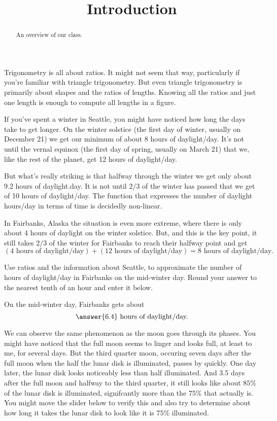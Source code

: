 \documentclass{ximera}
\title{Introduction}
\begin{document}
\begin{abstract}
An overview of our class.
\end{abstract}
\maketitle

Trigonometry is all about ratios. It might not seem that way, particularly if you're familiar with triangle trigonometry. But even triangle trigonometry is primarily about shapes and the ratios of lengths. Knowing all the ratios and just one length is enough to compute all lengths in a figure.

If you've spent a winter in Seattle, you might have noticed how long the days take to get longer. On the winter solstice (the first day of winter, usually on December 21) we get our minimum of about 8 hours of daylight/day. It's not until the vernal equinox
(the first day of spring, usually on March 21) that we, like the rest of the planet, get 12 hours of daylight/day.

But what's really striking is that halfway through the winter we get only about 9.2 hours of daylight.day. It is not until $2/3$ of the winter has passed that we get of 10 hours of daylight/day. The function that expresses the number of daylight hours/day in terms of time is decidedly non-linear.

In Fairbanks, Alaska the situation is even more extreme, where there is only about 4 hours of daylight on the winter solstice. But, and this is the key point, it still takes $2/3$ of the winter for Fairbanks to reach their halfway point and get
\[
  ( 4 \text{ hours of daylight/day}) + ( 12 \text{ hours of daylight/day}) =  8 \text{ hours of daylight/day}.
\]  

\begin{question} \label{Q1:Introduction}
Use ratios and the information about Seattle, to approximate the number of hours of daylight/day in Fairbanks on the mid-winter day. Round your answer to the nearest tenth of an hour and enter it below.

On the mid-winter day, Fairbanks gets about 
\[
    \answer{6.4} \text{ hours of daylight/day.}
\]
\end{question}

We can observe the same phenomenon as the moon goes through its phases. You might have noticed that the full moon seems to linger and looks full, at least to me, for several days. But the third quarter moon, occuring seven days after the full moon when the half the lunar disk is illuminated, passes by quickly. One day later, the lunar disk looks noticeably less than half illuminated. And 3.5 days after the full moon and halfway to the third quarter, it still looks like about $85\%$ of the lunar disk is illuminated, signifcantly more than the $75\%$ that actually is. You might move the slider below to verify this and also try to  determine about how long it takes the lunar disk to look like it is $75\%$ illuminated.
\end{document}
